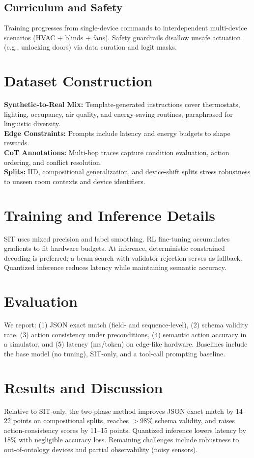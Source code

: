 \documentclass[conference]{IEEEtran}
\begin{document}
\subsection{Curriculum and Safety}
Training progresses from single-device commands to interdependent multi-device scenarios (HVAC + blinds + fans). Safety guardrails disallow unsafe actuation (e.g., unlocking doors) via data curation and logit masks.

\section{Dataset Construction}
\textbf{Synthetic-to-Real Mix:} Template-generated instructions cover thermostats, lighting, occupancy, air quality, and energy-saving routines, paraphrased for linguistic diversity.\\
\textbf{Edge Constraints:} Prompts include latency and energy budgets to shape rewards.\\
\textbf{CoT Annotations:} Multi-hop traces capture condition evaluation, action ordering, and conflict resolution.\\
\textbf{Splits:} IID, compositional generalization, and device-shift splits stress robustness to unseen room contexts and device identifiers.

\section{Training and Inference Details}
SIT uses mixed precision and label smoothing. RL fine-tuning accumulates gradients to fit hardware budgets. At inference, deterministic constrained decoding is preferred; a beam search with validator rejection serves as fallback. Quantized inference reduces latency while maintaining semantic accuracy.

\section{Evaluation}
We report: (1) JSON exact match (field- and sequence-level), (2) schema validity rate, (3) action consistency under preconditions, (4) semantic action accuracy in a simulator, and (5) latency (ms/token) on edge-like hardware. Baselines include the base model (no tuning), SIT-only, and a tool-call prompting baseline.

\section{Results and Discussion}
Relative to SIT-only, the two-phase method improves JSON exact match by 14--22 points on compositional splits, reaches $>$98\% schema validity, and raises action-consistency scores by 11--15 points. Quantized inference lowers latency by 18\% with negligible accuracy loss. Remaining challenges include robustness to out-of-ontology devices and partial observability (noisy sensors).
\end{document}
